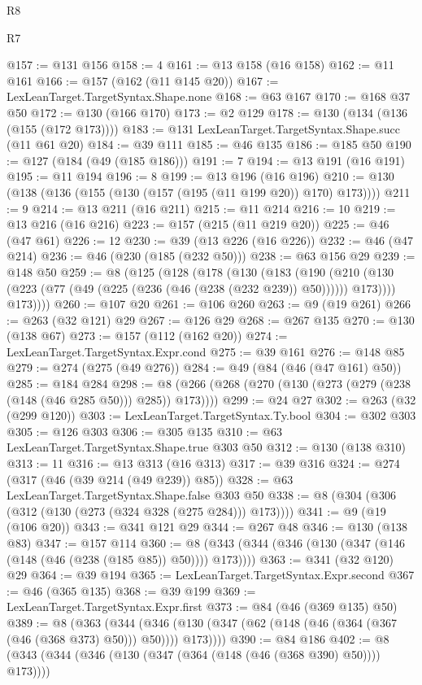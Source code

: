\begin{lexlean}{R8}
\begin{lexlean}{R7}
\begin{coremodule}
{{{{{{{{{{{{{{{{{{{{@157 := @131 @156
@158 := 4
@161 := @13 @158 (@16 @158)
@162 := @11 @161
@166 := @157 (@162 (@11 @145 @20))
@167 := LexLeanTarget.TargetSyntax.Shape.none
@168 := @63 @167
@170 := @168 @37 @50
@172 := @130 (@166 @170)
@173 := @2 @129
@178 := @130 (@134 (@136 (@155 (@172 @173))))
@183 := @131 LexLeanTarget.TargetSyntax.Shape.succ (@11 @61 @20)
@184 := @39 @111
@185 := @46 @135
@186 := @185 @50
@190 := @127 (@184 (@49 (@185 @186)))
@191 := 7
@194 := @13 @191 (@16 @191)
@195 := @11 @194
@196 := 8
@199 := @13 @196 (@16 @196)
@210 := @130 (@138 (@136 (@155 (@130 (@157 (@195 (@11 @199 @20)) @170) @173))))
@211 := 9
@214 := @13 @211 (@16 @211)
@215 := @11 @214
@216 := 10
@219 := @13 @216 (@16 @216)
@223 := @157 (@215 (@11 @219 @20))
@225 := @46 (@47 @61)
@226 := 12
@230 := @39 (@13 @226 (@16 @226))
@232 := @46 (@47 @214)
@236 := @46 (@230 (@185 (@232 @50)))
@238 := @63 @156 @29
@239 := @148 @50
@259 := @8
    (@125
      (@128
        (@178
          (@130
            (@183
              (@190
                (@210 (@130 (@223 (@77 (@49 (@225 (@236 (@46 (@238 (@232 @239)) @50)))))) @173))))
            @173))))
@260 := @107 @20
@261 := @106 @260
@263 := @9 (@19 @261)
@266 := @263 (@32 @121) @29
@267 := @126 @29
@268 := @267 @135
@270 := @130 (@138 @67)
@273 := @157 (@112 (@162 @20))
@274 := LexLeanTarget.TargetSyntax.Expr.cond
@275 := @39 @161
@276 := @148 @85
@279 := @274 (@275 (@49 @276))
@284 := @49 (@84 (@46 (@47 @161) @50))
@285 := @184 @284
@298 := @8 (@266 (@268 (@270 (@130 (@273 (@279 (@238 (@148 (@46 @285 @50))) @285)) @173))))
@299 := @24 @27
@302 := @263 (@32 (@299 @120))
@303 := LexLeanTarget.TargetSyntax.Ty.bool
@304 := @302 @303
@305 := @126 @303
@306 := @305 @135
@310 := @63 LexLeanTarget.TargetSyntax.Shape.true @303 @50
@312 := @130 (@138 @310)
@313 := 11
@316 := @13 @313 (@16 @313)
@317 := @39 @316
@324 := @274 (@317 (@46 (@39 @214 (@49 @239)) @85))
@328 := @63 LexLeanTarget.TargetSyntax.Shape.false @303 @50
@338 := @8 (@304 (@306 (@312 (@130 (@273 (@324 @328 (@275 @284))) @173))))
@341 := @9 (@19 (@106 @20))
@343 := @341 @121 @29
@344 := @267 @48
@346 := @130 (@138 @83)
@347 := @157 @114
@360 := @8 (@343 (@344 (@346 (@130 (@347 (@146 (@148 (@46 (@238 (@185 @85)) @50)))) @173))))
@363 := @341 (@32 @120) @29
@364 := @39 @194
@365 := LexLeanTarget.TargetSyntax.Expr.second
@367 := @46 (@365 @135)
@368 := @39 @199
@369 := LexLeanTarget.TargetSyntax.Expr.first
@373 := @84 (@46 (@369 @135) @50)
@389 := @8
    (@363
      (@344 (@346 (@130 (@347 (@62 (@148 (@46 (@364 (@367 (@46 (@368 @373) @50))) @50)))) @173))))
@390 := @84 @186
@402 := @8 (@343 (@344 (@346 (@130 (@347 (@364 (@148 (@46 (@368 @390) @50)))) @173))))
}}}}}}}}}}}}}}}}}}}}
\end{coremodule}
\end{lexlean}
\end{lexlean}
